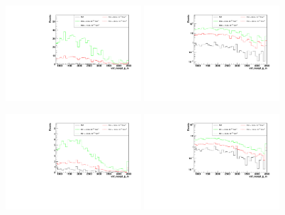 \begin{figure}[h]
  \begin{center}
	\includegraphics[width=0.45\textwidth]{Plots/aQGC_kinematics/vbf_maxpt_jj_m_FS0.pdf}%
	\includegraphics[width=0.45\textwidth]{Plots/aQGC_kinematics/vbf_maxpt_jj_m_FS0_log.pdf}\\
    \caption{}
  \end{center}
\end{figure}
\begin{figure}[h]
  \begin{center}
	\includegraphics[width=0.45\textwidth]{Plots/aQGC_kinematics/vbf_maxpt_jj_m_FS1.pdf}%
	\includegraphics[width=0.45\textwidth]{Plots/aQGC_kinematics/vbf_maxpt_jj_m_FS1_log.pdf}\\
    \caption{}
  \end{center}
\end{figure}
